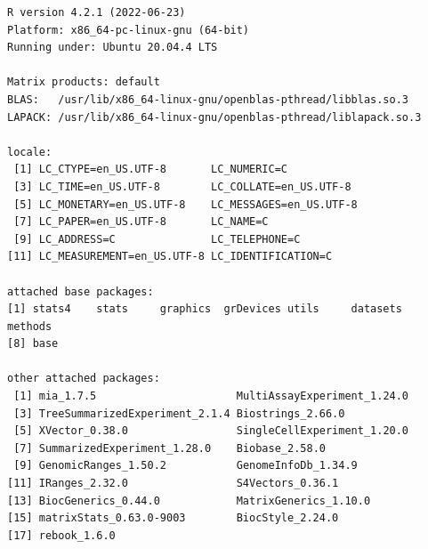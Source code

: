\documentclass[
]{book}
\begin{document}
\begin{verbatim}
R version 4.2.1 (2022-06-23)
Platform: x86_64-pc-linux-gnu (64-bit)
Running under: Ubuntu 20.04.4 LTS

Matrix products: default
BLAS:   /usr/lib/x86_64-linux-gnu/openblas-pthread/libblas.so.3
LAPACK: /usr/lib/x86_64-linux-gnu/openblas-pthread/liblapack.so.3

locale:
 [1] LC_CTYPE=en_US.UTF-8       LC_NUMERIC=C              
 [3] LC_TIME=en_US.UTF-8        LC_COLLATE=en_US.UTF-8    
 [5] LC_MONETARY=en_US.UTF-8    LC_MESSAGES=en_US.UTF-8   
 [7] LC_PAPER=en_US.UTF-8       LC_NAME=C                 
 [9] LC_ADDRESS=C               LC_TELEPHONE=C            
[11] LC_MEASUREMENT=en_US.UTF-8 LC_IDENTIFICATION=C       

attached base packages:
[1] stats4    stats     graphics  grDevices utils     datasets  methods  
[8] base     

other attached packages:
 [1] mia_1.7.5                      MultiAssayExperiment_1.24.0   
 [3] TreeSummarizedExperiment_2.1.4 Biostrings_2.66.0             
 [5] XVector_0.38.0                 SingleCellExperiment_1.20.0   
 [7] SummarizedExperiment_1.28.0    Biobase_2.58.0                
 [9] GenomicRanges_1.50.2           GenomeInfoDb_1.34.9           
[11] IRanges_2.32.0                 S4Vectors_0.36.1              
[13] BiocGenerics_0.44.0            MatrixGenerics_1.10.0         
[15] matrixStats_0.63.0-9003        BiocStyle_2.24.0              
[17] rebook_1.6.0                  


\end{verbatim}
\end{document}
